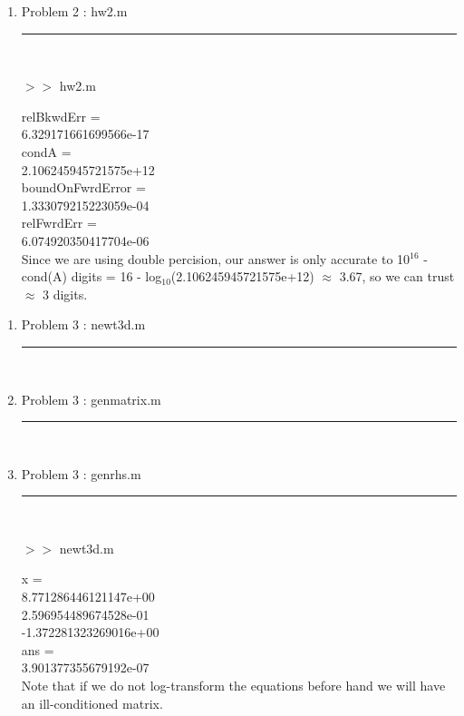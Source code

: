 \documentclass[12pt]{article}
\newcommand*\lstinputpath[1]{\lstset{inputpath=#1}}
\begin{document}
\pagebreak	
	
	\begin{enumerate}
	
	\item[] Problem 2 : hw2.m \noindent\rule{\textwidth}{1.0pt} \\
	\lstinputpath{P2}
		
	
	\pagebreak	
	
	$>>$ hw2.m
	\begin{framed}
relBkwdErr =\\
     6.329171661699566e-17\\

condA =\\
     2.106245945721575e+12\\


boundOnFwrdError =\\
     1.333079215223059e-04\\


relFwrdErr =\\
     6.074920350417704e-06\\

Since we are using double percision, our answer is only accurate to 10$^{16}$ - cond(A) digits = 16 - log$_{10}$(2.106245945721575e+12)  $\approx$ 3.67, so we can trust $\approx$ 3 digits.
	\end{framed}
	
	\end{enumerate}
	
\pagebreak	
	
	\begin{enumerate}
	
	\item[] Problem 3 : newt3d.m \noindent\rule{\textwidth}{1.0pt} \\
	\lstinputpath{P3}
		
	
	\item[] Problem 3 : genmatrix.m \noindent\rule{\textwidth}{1.0pt} \\
		
	
	\item[] Problem 3 : genrhs.m \noindent\rule{\textwidth}{1.0pt} \\
		
	
	\pagebreak	
	
	$>>$ newt3d.m
	\begin{framed}
	x =\\
     8.771286446121147e+00\\
     2.596954489674528e-01\\
    -1.372281323269016e+00\\

ans =\\
     3.901377355679192e-07 \\ 
     
     Note that if we do not log-transform the equations before hand we will have an ill-conditioned matrix.
	\end{framed}
	
	\end{enumerate}
	
\end{document}
